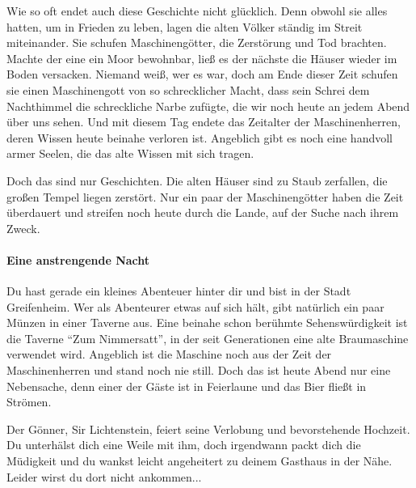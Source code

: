 Wie so oft endet auch diese Geschichte nicht glücklich. Denn obwohl sie alles hatten, um in Frieden zu leben, lagen die alten Völker ständig im Streit miteinander. Sie schufen Maschinengötter, die Zerstörung und Tod brachten. Machte der eine ein Moor bewohnbar, ließ es der nächste die Häuser wieder im Boden versacken. Niemand weiß, wer es war, doch am Ende dieser Zeit schufen sie einen Maschinengott von so schrecklicher Macht, dass sein Schrei dem Nachthimmel die schreckliche Narbe zufügte, die wir noch heute an jedem Abend über uns sehen. Und mit diesem Tag endete das Zeitalter der Maschinenherren, deren Wissen heute beinahe verloren ist. Angeblich gibt es noch eine handvoll armer Seelen, die das alte Wissen mit sich tragen.

Doch das sind nur Geschichten. Die alten Häuser sind zu Staub zerfallen, die großen Tempel liegen zerstört. Nur ein paar der Maschinengötter haben die Zeit überdauert und streifen noch heute durch die Lande, auf der Suche nach ihrem Zweck.

\paragraph{Eine anstrengende Nacht}

Du hast gerade ein kleines Abenteuer hinter dir und bist in der Stadt Greifenheim. Wer als Abenteurer etwas auf sich hält, gibt natürlich ein paar Münzen in einer Taverne aus. Eine beinahe schon berühmte Sehenswürdigkeit ist die Taverne ``Zum Nimmersatt'', in der seit Generationen eine alte Braumaschine verwendet wird. Angeblich ist die Maschine noch aus der Zeit der Maschinenherren und stand noch nie still. Doch das ist heute Abend nur eine Nebensache, denn einer der Gäste ist in Feierlaune und das Bier fließt in Strömen.

Der Gönner, Sir Lichtenstein, feiert seine Verlobung und bevorstehende Hochzeit. Du unterhälst dich eine Weile mit ihm, doch irgendwann packt dich die Müdigkeit und du wankst leicht angeheitert zu deinem Gasthaus in der Nähe. Leider wirst du dort nicht ankommen...
